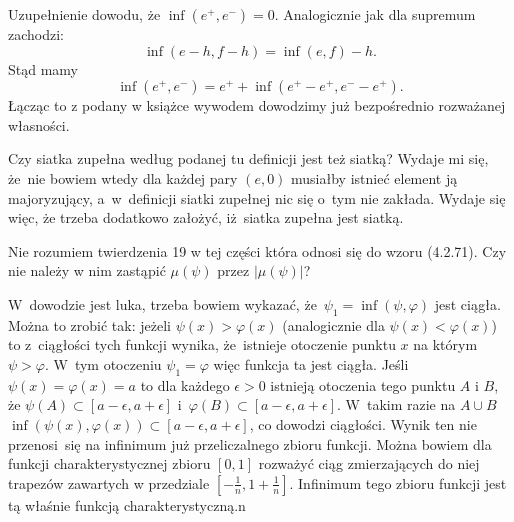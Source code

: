 \documentclass[a4paper,11pt]{article}
\numberwithin{equation}{section}
\begin{document}
\noindent
{} Uzupełnienie dowodu, że
$\inf( e^{ + }, e^{ - } ) = 0$. Analogicznie jak dla supremum
zachodzi:
\begin{equation}
  \label{eq:SchwartzKAMVolI-09}
  \inf( e - h, f - h ) = \inf( e, f ) - h.
\end{equation}
Stąd mamy
\begin{equation}
  \label{eq:SchwartzKAMVolI-10}
  \inf( e^{ + }, e^{ - } )
  =
  e^{ + } + \inf( e^{ + } - e^{ + }, e^{ - } - e^{ + } ).
\end{equation}
Łącząc to z podany w książce wywodem dowodzimy już bezpośrednio
rozważanej własności.

\VerSpaceFour





\noindent
{} Czy siatka zupełna według podanej tu definicji jest
też siatką? Wydaje mi się, że~nie bowiem wtedy dla każdej pary
$( e, 0 )$ musiałby istnieć element ją majoryzujący, a~w~definicji
siatki zupełnej nic się o~tym nie zakłada. Wydaje się więc, że trzeba
dodatkowo założyć, iż~siatka zupełna jest siatką.

\VerSpaceFour





\noindent
{} Nie rozumiem twierdzenia 19 w tej części która odnosi
się do wzoru (4.2.71). Czy nie należy w nim zastąpić $\mu( \psi )$
przez $| \mu( \psi ) |$?

\VerSpaceFour





\noindent
{} W~dowodzie jest luka, trzeba bowiem wykazać,
że~$\psi_{ 1 } = \inf( \psi, \varphi )$ jest ciągła. Można to zrobić
tak: jeżeli $\psi( x ) > \varphi( x )$ (analogicznie dla
$\psi( x ) < \varphi( x )$) to z~ciągłości tych funkcji wynika,
że~istnieje otoczenie punktu $x$ na którym $\psi > \varphi$. W~tym
otoczeniu $\psi_{ 1 } = \varphi$ więc funkcja ta jest ciągła. Jeśli
$\psi( x ) = \varphi( x ) = a$ to dla każdego $\epsilon > 0$ istnieją
otoczenia tego punktu $A$ i $B$, że
$\psi( A ) \subset [ a - \epsilon, a + \epsilon ]$
i~$\varphi( B ) \subset [ a - \epsilon, a + \epsilon ]$. W~takim razie
na $A \cup B$
$\inf( \psi( x ), \varphi( x ) ) \subset [ a - \epsilon, a + \epsilon
]$, co dowodzi ciągłości. Wynik ten nie przenosi~się na infinimum już
przeliczalnego zbioru funkcji. Można bowiem dla funkcji
charakterystycznej zbioru $[ 0, 1 ]$ rozważyć ciąg zmierzających do niej
trapezów zawartych w przedziale
$[-\frac{ 1 }{ n }, 1 + \frac{ 1 }{ n } ]$. Infinimum tego zbioru
funkcji jest tą właśnie funkcją charakterystyczną.n
\end{document}
